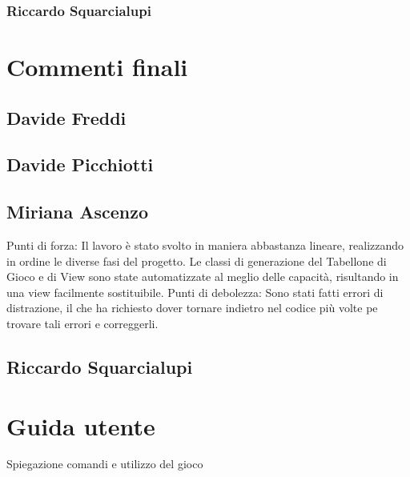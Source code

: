 \documentclass[a4paper,12pt]{report}
\begin{document}
	\subsection{Riccardo Squarcialupi}

	\chapter{Commenti finali}

	\section{Davide Freddi}
	\section{Davide Picchiotti}
	\section{Miriana Ascenzo}

	Punti di forza:
	Il lavoro è stato svolto in maniera abbastanza lineare, realizzando in ordine le diverse fasi del progetto.
	Le classi di generazione del Tabellone di Gioco e di View sono state automatizzate al meglio delle capacità, risultando in una view facilmente sostituibile.
	Punti di debolezza:
	Sono stati fatti errori di distrazione, il che ha richiesto dover tornare indietro nel codice più volte pe trovare tali errori e correggerli.


	\section{Riccardo Squarcialupi}

	\appendix
	\chapter{Guida utente}

	Spiegazione comandi e utilizzo del gioco
\end{document}
